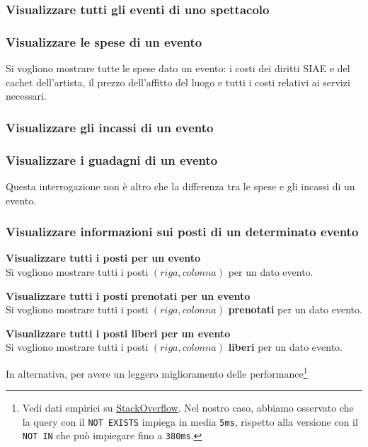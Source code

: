\documentclass[a4paper,11pt]{article}
\begin{document}
\subsubsection{Visualizzare tutti gli eventi di uno spettacolo}


\subsubsection{Visualizzare le spese di un evento}
Si vogliono mostrare tutte le spese dato un evento: i costi dei diritti SIAE e del
cachet dell'artista, il prezzo dell'affitto del luogo e tutti i costi relativi ai
servizi necessari.


\subsubsection{Visualizzare gli incassi di un evento}


\subsubsection{Visualizzare i guadagni di un evento}
Questa interrogazione non è altro che la differenza tra le spese e gli incassi di un evento.


\subsubsection{Visualizzare informazioni sui posti di un determinato evento}

\textbf{Visualizzare tutti i posti per un evento}\\
Si vogliono mostrare tutti i posti $(riga, colonna)$ per un dato evento.

\textbf{Visualizzare tutti i posti prenotati per un evento}\\
Si vogliono mostrare tutti i posti $(riga, colonna)$ \textbf{prenotati} per un dato evento.

\textbf{Visualizzare tutti i posti liberi per un evento}\\
Si vogliono mostrare tutti i posti $(riga, colonna)$ \textbf{liberi} per un dato evento.


In alternativa, per avere un leggero miglioramento delle performance\footnote{
Vedi dati empirici su \href{https://stackoverflow.com/a/66785790}{StackOverflow}.
Nel nostro caso, abbiamo osservato che la query con il \texttt{NOT EXISTS}
impiega in media \texttt{5ms}, rispetto alla versione con il \texttt{NOT IN}
che pu\`o impiegare fino a \texttt{380ms}.}

\end{document}
